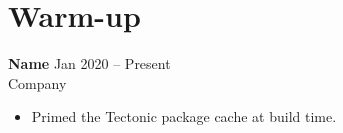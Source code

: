 \documentclass[11pt]{article}
\begin{document}
\section*{Warm-up}
\textbf{Name} \hfill Jan 2020 -- Present\\
Company
\begin{itemize}[leftmargin=*]
\item Primed the Tectonic package cache at build time.
\end{itemize}
\end{document}
